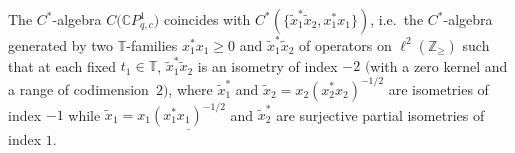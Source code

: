 \begin{theorem}\label{generators} The $C^*$-algebra $C\big(\mathbb{C}P_{q,c}^{1}\big)$ coincides with $C^{\ast} (
 \{ \tilde{x}_{1}^{\ast}\tilde{x}_{2},x_{1}^{\ast}x_{1} \} )
$, i.e.\ the $C^*$-algebra generated by two $\mathbb{T}$-families $x_{1}^{\ast}x_{1}\geq0$ and
$\tilde{x}_{1}^{\ast}\tilde{x}_{2}$ of operators on $\ell^{2} (
\mathbb{Z}_{\geq} ) $ such that at each fixed $t_{1}\mathbb{\in
}\mathbb{T}$, $\tilde{x}_{1}^{\ast}\tilde{x}_{2}$ is an isometry of index $-2$
$($with a zero kernel and a range of codimension~$2)$, where $\tilde{x}%
_{1}^{\ast}$ and $\tilde{x}_{2}=x_{2} ( x_{2}^{\ast}x_{2} )
^{-1/2}$ are isometries of index $-1$ while $\tilde{x}_{1}=x_{1}%
\underline{ ( x_{1}^{\ast}x_{1} ) ^{-1/2}}$ and $\tilde{x}%
_{2}^{\ast}$ are surjective partial isometries of index $1$.
\end{theorem}
